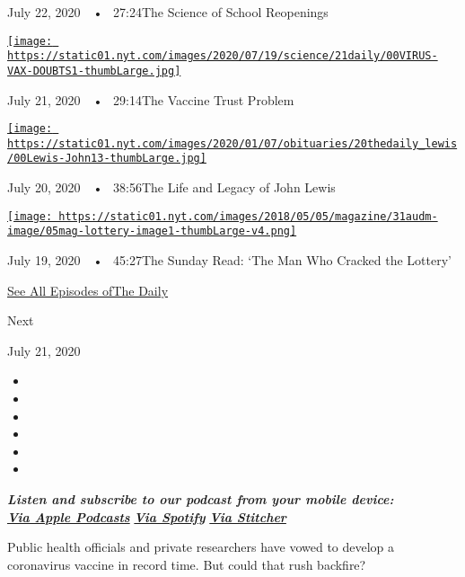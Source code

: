 July 22, 2020~~•~ 27:24The Science of School Reopenings

\href{https://www.nytimes.com/2020/07/21/podcasts/the-daily/coronavirus-vaccine.html?action=click\&module=audio-series-bar\&region=header\&pgtype=Article}{\texttt{[image: https://static01.nyt.com/images/2020/07/19/science/21daily/00VIRUS-VAX-DOUBTS1-thumbLarge.jpg]}}

July 21, 2020~~•~ 29:14The Vaccine Trust Problem

\href{https://www.nytimes.com/2020/07/20/podcasts/the-daily/john-lewis.html?action=click\&module=audio-series-bar\&region=header\&pgtype=Article}{\texttt{[image: https://static01.nyt.com/images/2020/01/07/obituaries/20thedaily\_lewis/00Lewis-John13-thumbLarge.jpg]}}

July 20, 2020~~•~ 38:56The Life and Legacy of John Lewis

\href{https://www.nytimes.com/2020/07/19/podcasts/the-daily/lottery-winner-scam.html?action=click\&module=audio-series-bar\&region=header\&pgtype=Article}{\texttt{[image: https://static01.nyt.com/images/2018/05/05/magazine/31audm-image/05mag-lottery-image1-thumbLarge-v4.png]}}

July 19, 2020~~•~ 45:27The Sunday Read: `The Man Who Cracked the
Lottery'

\href{https://www.nytimes.com/column/the-daily}{See All Episodes ofThe
Daily}

Next

July 21, 2020

\begin{itemize}
\item
\item
\item
\item
\item
\item
\end{itemize}

\emph{\textbf{Listen and subscribe to our podcast from your mobile
device:}}\\
\textbf{\href{https://itunes.apple.com/us/podcast/the-daily/id1200361736?mt=2}{\emph{Via
Apple Podcasts}}} \emph{\textbf{\textbar{}}}
\textbf{\href{https://open.spotify.com/show/3IM0lmZxpFAY7CwMuv9H4g?si=SfuMSC55R1qprFsRZU3_zw}{\emph{Via
Spotify}}} \emph{\textbf{\textbar{}}}
\textbf{\href{http://www.stitcher.com/podcast/the-new-york-times/the-daily-10}{\emph{Via
Stitcher}}}

Public health officials and private researchers have vowed to develop a
coronavirus vaccine in record time. But could that rush backfire?


